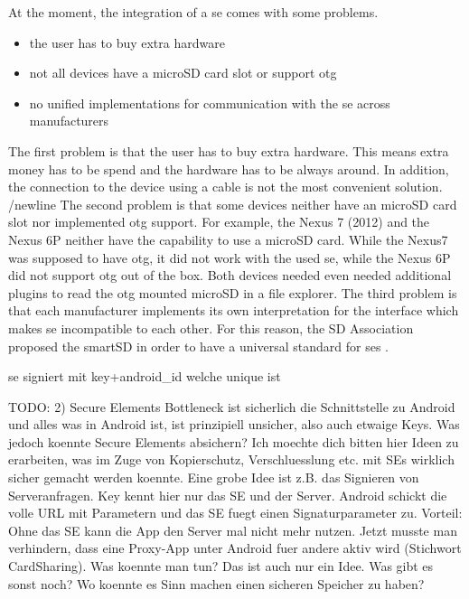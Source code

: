 At the moment, the integration of a \gls{se} comes with some problems.
\begin{itemize}
  \item the user has to buy extra hardware
  \item not all devices have a microSD card slot or support \gls{otg}
  \item no unified implementations for communication with the \gls{se} across manufacturers
\end{itemize}
The first problem is that the user has to buy extra hardware.
This means extra money has to be spend and the hardware has to be always around.
In addition, the connection to the device using a cable is not the most convenient solution.
/newline
The second problem is that some devices neither have an microSD card slot nor implemented \gls{otg} support.
For example, the Nexus 7 (2012) and the Nexus 6P neither have the capability to use a microSD card.
While the Nexus7 was supposed to have \gls{otg}, it did not work with the used \gls{se}, while the Nexus 6P did not support \gls{otg} out of the box.
Both devices needed even needed additional plugins to read the \gls{otg} mounted microSD in a file explorer.
The third problem is that each manufacturer implements its own interpretation for the interface which makes \gls{se} incompatible to each other.
For this reason, the SD Association proposed the smartSD in order to have a universal standard for \gls{se}s \cite{smartSD}.
\newline


se signiert mit key+android\_id welche unique ist

TODO:
2) Secure Elements
Bottleneck ist sicherlich die Schnittstelle zu Android und alles was in Android ist, ist prinzipiell unsicher, also auch etwaige Keys. Was jedoch koennte Secure Elements absichern? Ich moechte dich bitten hier Ideen zu erarbeiten, was im Zuge von Kopierschutz,  Verschluesslung etc. mit SEs wirklich sicher gemacht werden koennte. Eine grobe Idee ist z.B. das Signieren von Serveranfragen. Key kennt hier nur das SE und der Server. Android schickt die volle URL mit Parametern und das SE fuegt einen Signaturparameter zu. Vorteil: Ohne das SE kann die App den Server mal nicht mehr nutzen. Jetzt musste man verhindern, dass eine Proxy-App unter Android fuer andere aktiv wird (Stichwort CardSharing). Was koennte man tun? Das ist auch nur ein Idee. Was gibt es sonst noch? Wo koennte es Sinn machen einen sicheren Speicher zu haben?
